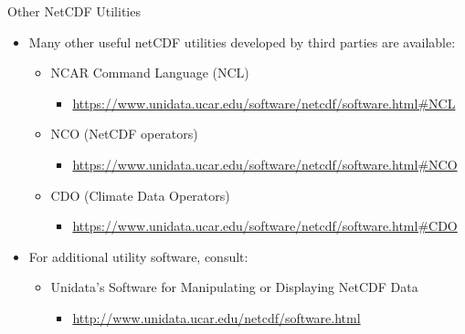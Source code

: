 \documentclass[compress,11pt,xcolor=svgnames,aspectratio=169]{beamer}
\begin{document}
\begin{frame}[fragile]{Other NetCDF Utilities}

\begin{itemize}
\setlength\itemsep{0.5cm}

  \item Many other useful netCDF utilities developed by third parties are available:

  \begin{itemize}
    \item {\footnotesize NCAR Command Language (NCL)}
    \begin{itemize}
      \item {\scriptsize \url{https://www.unidata.ucar.edu/software/netcdf/software.html#NCL}}
    \end{itemize}
    \item {\footnotesize NCO (NetCDF operators)}
    \begin{itemize}
      \item {\scriptsize \url{https://www.unidata.ucar.edu/software/netcdf/software.html#NCO}}
    \end{itemize}
    \item {\footnotesize CDO (Climate Data Operators)}
    \begin{itemize}
      \item {\scriptsize \url{https://www.unidata.ucar.edu/software/netcdf/software.html#CDO}}
    \end{itemize}
  \end{itemize}

  \item For additional utility software, consult:

  \begin{itemize}
    \item {\footnotesize Unidata's Software for Manipulating or Displaying NetCDF Data}
    \begin{itemize}
      \item {\scriptsize \url{http://www.unidata.ucar.edu/netcdf/software.html}}
    \end{itemize}
  \end{itemize}

\end{itemize}

\end{frame}
\end{document}
